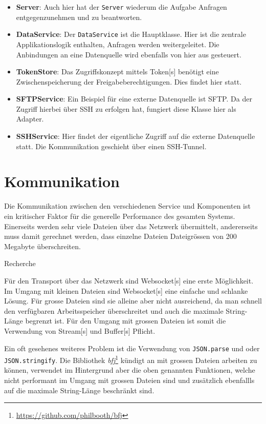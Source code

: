 \begin{itemize}
    \item \textbf{Server}: Auch hier hat der \texttt{Server} wiederum die Aufgabe Anfragen entgegenzunehmen und zu beantworten.
    \item \textbf{DataService}: Der \texttt{DataService} ist die Hauptklasse. Hier ist die zentrale Applikationslogik enthalten, Anfragen werden weitergeleitet. Die Anbindungen an eine Datenquelle wird ebenfalls von hier aus gesteuert.
    \item \textbf{TokenStore}: Das Zugriffskonzept mittels \gls{Token}[s] benötigt eine Zwischenspeicherung der Freigabeberechtigungen. Dies findet hier statt. 
    \item \textbf{SFTPService}: Ein Beispiel für eine externe Datenquelle ist \gls{SFTP}. Da der Zugriff hierbei über \gls{SSH} zu erfolgen hat, fungiert diese Klasse hier als Adapter.
    \item \textbf{SSHService}: Hier findet der eigentliche Zugriff auf die externe Datenquelle statt. Die Kommunikation geschieht über einen \gls{SSH}-Tunnel.
\end{itemize}


\section{Kommunikation}

Die Kommunikation zwischen den verschiedenen Service und Komponenten ist ein kritischer Faktor für die generelle Performance des gesamten Systems. Einerseits werden sehr viele Dateien über das Ne\-tz\-we\-rk übermittelt, andererseits muss damit ge\-rech\-net werden, dass einzelne Dateien Dateigrössen von 200 Megabyte überschreiten.

Recherche

Für den Transport über das Netzwerk sind \gls{Websocket}[s] eine erste Möglichkeit. Im Umgang mit kleinen Dateien sind \gls{Websocket}[s] eine einfache und schlanke Lösung. Für grosse Dateien sind sie alleine aber nicht ausreichend, da man schnell den verfügbaren Arbeitsspeicher überschreitet und auch die maximale String-Länge begrenzt ist. Für den Umgang mit grossen Dateien ist somit die Verwendung von \gls{Stream}[s] und \gls{Buffer}[s] Pflicht. 

Ein oft gesehenes weiteres Problem ist die Verwendung von \texttt{JSON\-.parse} und oder \texttt{JSON.stringify}.
Die Bibliothek \textit{bfj}\footnote{\url{https://github.com/philbooth/bfj}} kündigt an mit grossen Dateien arbeiten zu können, verwendet im Hintergrund aber die oben genannten Funktionen, welche nicht performant im Umgang mit grossen Dateien sind und zusätzlich ebenfallls auf die maximale String-Länge beschränkt sind.

